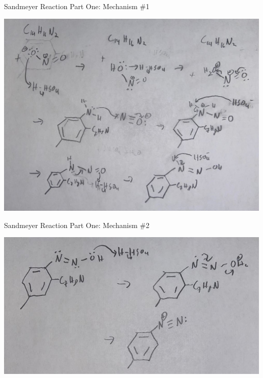 \documentclass[notes]{beamer}
\begin{document}
\begin{frame}{Sandmeyer Reaction Part One: Mechanism \#1}

\begin{center}
    \includegraphics[scale=.35]{sandmeyer_part_one_one.JPG}
\end{center}

    
\end{frame}

\begin{frame}{Sandmeyer Reaction Part One: Mechanism \#2}

\begin{center}
    \includegraphics[scale=.38]{sandmeyer_part_one_two.JPG}
\end{center}

    
\end{frame}
\end{document}
